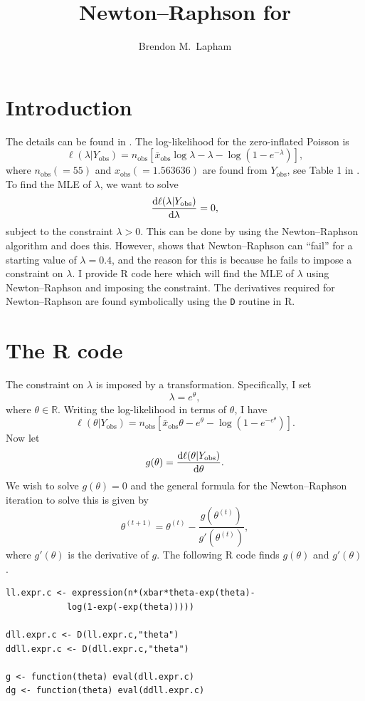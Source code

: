 \documentclass[a4paper,10pt]{article}
\title{Newton--Raphson for \citet{meng1997em}}
\author{Brendon M.\ Lapham}
\newcommand{\ndd}{ {\rm d}}
\begin{document}
  
 \maketitle

\section{Introduction}
The details can be found in \citet{meng1997em}.
The log-likelihood for the zero-inflated Poisson is
$$ \ell(\lambda |Y_{\text{obs}}) = n_\text{obs}[\bar x_\text{obs} \log \lambda - \lambda -  \log(1-e^{-\lambda}) ],   $$
where $n_\text{obs} (= 55)$ and $x_\text{obs} (=1.563636)$ are found from $Y_{\text{obs}}$, see Table 1 in \citet{meng1997em}.
To find the MLE of $\lambda$, we want to solve
$$ \frac{ \ndd \ell(\lambda |Y_{\text{obs}}) }{ \ndd \lambda} = 0, $$
subject to the constraint $\lambda >0$.
This can be done by using the Newton--Raphson algorithm and \citet{meng1997em} does this.
However, \citet{meng1997em} shows that Newton--Raphson can ``fail'' for a starting value of $\lambda=0.4$, and the reason for this is because he fails to impose a constraint on $\lambda$.
I provide {\sf R} code here which will find the MLE of $\lambda$ using Newton--Raphson and imposing the constraint.
The derivatives required for Newton--Raphson are found symbolically using the {\tt D} routine in {\sf R}. 

\section{The {\sf R} code} 

The constraint on $\lambda$ is imposed by a transformation.
Specifically, I set
$$ \lambda = e^\theta, $$
where $\theta \in \mathbb{R}$.
Writing the log-likelihood in terms of $\theta$, I have
$$ \ell(\theta |Y_{\text{obs}}) = n_\text{obs}[\bar x_\text{obs} \theta - e^\theta -  \log(1-e^{-e^\theta}) ].   $$
Now let 
$$ g(\theta)  = \frac{ \ndd \ell(\theta |Y_{\text{obs}}) }{ \ndd \theta}. $$
We wish to solve $ g(\theta) = 0$ and the general formula for the Newton--Raphson iteration to solve this is given by
$$ \theta^{(t+1)} = \theta^{(t)} - \frac{g(\theta^{(t)})}{g'(\theta^{(t)})},  $$
where $g'(\theta)$ is the derivative of $g$.
The following {\sf R} code finds $g(\theta)$ and $g'(\theta)$.
\begin{Verbatim}[frame=lines]
ll.expr.c <- expression(n*(xbar*theta-exp(theta)-
			log(1-exp(-exp(theta)))))

dll.expr.c <- D(ll.expr.c,"theta")
ddll.expr.c <- D(dll.expr.c,"theta")

g <- function(theta) eval(dll.expr.c) 
dg <- function(theta) eval(ddll.expr.c) 
\end{Verbatim}
\end{document}
